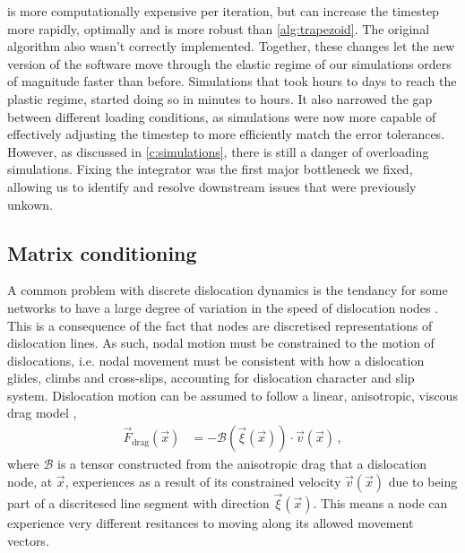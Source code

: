  is more computationally expensive per iteration, but can increase the timestep more rapidly, optimally and is more robust than \cref{alg:trapezoid}. The original algorithm also wasn't correctly implemented. Together, these changes let the new version of the software move through the elastic regime of our simulations orders of magnitude faster than before. Simulations that took hours to days to reach the plastic regime, started doing so in minutes to hours. It also narrowed the gap between different loading conditions, as simulations were now more capable of effectively adjusting the timestep to more efficiently match the error tolerances. However, as discussed in \cref{c:simulations}, there is still a danger of overloading simulations. Fixing the integrator was the first major bottleneck we fixed, allowing us to identify and resolve downstream issues that were previously unkown.

\subsection{Matrix conditioning}
\label{ss:matrix}

A common problem with discrete dislocation dynamics is the tendancy for some networks to have a large degree of variation in the speed of dislocation nodes \cite{bertin2019gpu,ddlab,arsenlis2007enabling}. This is a consequence of the fact that nodes are discretised representations of dislocation lines. As such, nodal motion must be constrained to the motion of dislocations, i.e. nodal movement must be consistent with how a dislocation glides, climbs and cross-slips, accounting for dislocation character and slip system. Dislocation motion can be assumed to follow a linear, anisotropic, viscous drag model \cite{ddlab},
\begin{align}\label{eq:dragCoef}
    \vec{F}_\textrm{drag}(\vec{x}) & = -\mathcal{B}(\vec{\xi}(\vec{x})) \cdot \vec{v}(\vec{x})\,,
\end{align}
where $\mathcal{B}$ is a tensor constructed from the anisotropic drag that a dislocation node, at $\vec{x}$, experiences as a result of its constrained velocity $\vec{v}(\vec{x})$ due to being part of a discritesed line segment with direction $\vec{\xi}(\vec{x})$. This means a node can experience very different resitances to moving along its allowed movement vectors.


